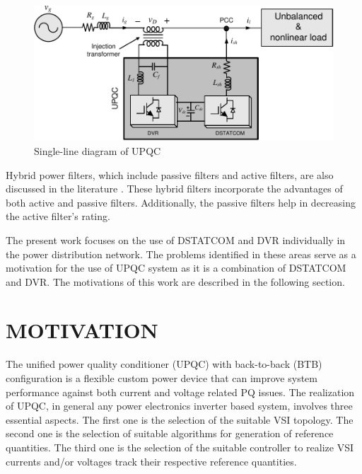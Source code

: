 \begin{figure}[ht]
	\centering
		\includegraphics[scale=0.88]{figures/Chapter_1_2/fig1p3}
	\caption{Single-line diagram of UPQC}
	\label{fig1.3}
\end{figure}

Hybrid power filters, which include passive filters and active filters, are also discussed in the literature \cite{libano1997simplified,fujita2000hybrid,peng1993compensation}. These hybrid filters incorporate the advantages of both active and passive filters. Additionally, the passive filters help in decreasing the active filter's rating.

The present work focuses on the use of DSTATCOM and DVR individually in the power distribution network. The problems identified in these areas serve as a motivation for the use of UPQC system as it is a combination of DSTATCOM and DVR. The motivations of this work are described in the following section.

\section{MOTIVATION}

 The unified power quality conditioner (UPQC) with back-to-back (BTB) configuration is a flexible custom power device that can improve system performance against both current and voltage related PQ issues. The realization of UPQC, in general any power electronics inverter based system, involves three essential aspects. The first one is the selection of the suitable VSI topology. The second one is the selection of suitable algorithms for generation of reference quantities. The third one is the selection of the suitable controller to realize VSI currents and/or voltages track their respective reference quantities. 
 
